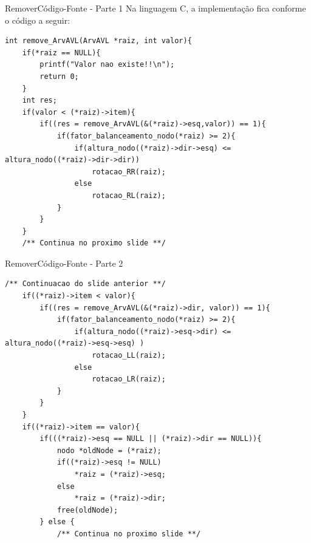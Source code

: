 \documentclass[aspectratio=169]{beamer}
\begin{document}

\begin{frame}[fragile]{Remover}{Código-Fonte - Parte 1}
Na linguagem C, a implementação fica conforme o código a seguir:
\begin{lstlisting}[style=CStyle,basicstyle=\tiny]
int remove_ArvAVL(ArvAVL *raiz, int valor){
	if(*raiz == NULL){
	    printf("Valor nao existe!!\n");
	    return 0;
	}
	int res;
	if(valor < (*raiz)->item){
	    if((res = remove_ArvAVL(&(*raiz)->esq,valor)) == 1){
            if(fator_balanceamento_nodo(*raiz) >= 2){
                if(altura_nodo((*raiz)->dir->esq) <= altura_nodo((*raiz)->dir->dir))
                    rotacao_RR(raiz);
                else
                    rotacao_RL(raiz);
            }
	    }
	}
    /** Continua no proximo slide **/   
\end{lstlisting}  
\end{frame}


\begin{frame}[fragile]{Remover}{Código-Fonte - Parte 2}
\begin{lstlisting}[style=CStyle,basicstyle=\tiny,firstnumber=17]
    /** Continuacao do slide anterior **/    
	if((*raiz)->item < valor){
	    if((res = remove_ArvAVL(&(*raiz)->dir, valor)) == 1){
            if(fator_balanceamento_nodo(*raiz) >= 2){
                if(altura_nodo((*raiz)->esq->dir) <= altura_nodo((*raiz)->esq->esq) )
                    rotacao_LL(raiz);
                else
                    rotacao_LR(raiz);
            }
	    }
	}
	if((*raiz)->item == valor){
	    if(((*raiz)->esq == NULL || (*raiz)->dir == NULL)){
            nodo *oldNode = (*raiz);
            if((*raiz)->esq != NULL)
                *raiz = (*raiz)->esq;
            else
                *raiz = (*raiz)->dir;
            free(oldNode);
        } else { 
            /** Continua no proximo slide **/   
\end{lstlisting}  
\end{frame}

\end{document}
